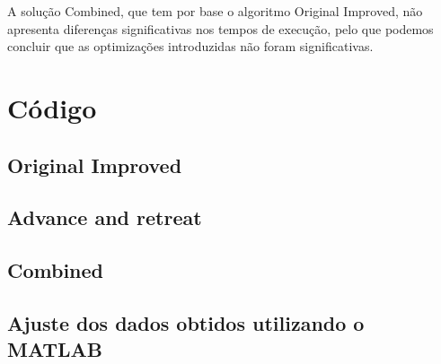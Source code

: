 \documentclass[portuguese,11pt,a4paper,titlepage]{article}
\newcommand{\srcdir}{..}
\newcommand{\matlabdir}{"../MATLAB-fittings"}
\begin{document}
A solução Combined, que tem por base o algoritmo Original Improved, não apresenta diferenças significativas nos tempos de execução,
pelo que podemos concluir que as optimizações introduzidas não foram significativas.

\pagebreak
{}
\fancyhfoffset{0pt}
\section{Código}
\subsection{Original Improved}

\pagebreak
\subsection{Advance and retreat}

\pagebreak
\subsection{Combined}

\pagebreak
\subsection{Ajuste dos dados obtidos utilizando o MATLAB}

\restoregeometry
\end{document}
